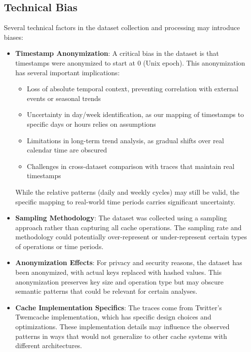 \documentclass[conference]{IEEEtran}
\begin{document}
\subsection{Technical Bias}

Several technical factors in the dataset collection and processing may introduce biases:

\begin{itemize}
    \item \textbf{Timestamp Anonymization}: A critical bias in the dataset is that timestamps were anonymized to start at 0 (Unix epoch). This anonymization has several important implications:
    \begin{itemize}
        \item Loss of absolute temporal context, preventing correlation with external events or seasonal trends
        \item Uncertainty in day/week identification, as our mapping of timestamps to specific days or hours relies on assumptions
        \item Limitations in long-term trend analysis, as gradual shifts over real calendar time are obscured
        \item Challenges in cross-dataset comparison with traces that maintain real timestamps
    \end{itemize}
    While the relative patterns (daily and weekly cycles) may still be valid, the specific mapping to real-world time periods carries significant uncertainty.
    
    \item \textbf{Sampling Methodology}: The dataset was collected using a sampling approach rather than capturing all cache operations. The sampling rate and methodology could potentially over-represent or under-represent certain types of operations or time periods.
    
    \item \textbf{Anonymization Effects}: For privacy and security reasons, the dataset has been anonymized, with actual keys replaced with hashed values. This anonymization preserves key size and operation type but may obscure semantic patterns that could be relevant for certain analyses.
    
    \item \textbf{Cache Implementation Specifics}: The traces come from Twitter's Twemcache implementation, which has specific design choices and optimizations. These implementation details may influence the observed patterns in ways that would not generalize to other cache systems with different architectures.
\end{itemize}
\end{document}
